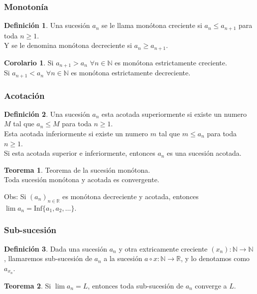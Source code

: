 \documentclass[10pt]{article}
\theoremstyle{definition}
\newtheorem{definition}{Definición}[section]
\newtheorem{theorem}{Teorema}[section]
\newtheorem{corollary}{Corolario}[theorem]
\begin{document}
\subsubsection{Monotonía}
\begin{definition}
	Una sucesión $a_n$ se le llama monótona creciente si $a_n\le a_{n+1}$ para toda $n\ge 1$.\\
	Y se le denomina monótona decreciente si $a_n\ge a_{n+1}$.
\end{definition}
\begin{corollary}
	Si $a_{n+1}>a_n$ $\forall n\in\mathbb{N}$ es monótona estrictamente creciente.\\
	Si $a_{n+1}<a_n$ $\forall n\in\mathbb{N}$ es monótona estrictamente decreciente.
\end{corollary}
\subsubsection{Acotación}
\begin{definition}
	Una sucesión $a_n$ esta acotada superiormente si existe un numero $M$ tal que $a_n \le M$ para toda $n\ge 1$.\\
	Esta acotada inferiormente si existe un numero $m$ tal que $m\le a_n$ para toda $n\ge 1$.\\
	Si esta acotada superior e inferiormente, entonces $a_n$ es una sucesión acotada.
\end{definition}
\begin{theorem}{Teorema de la sucesión monótona.}
	\\Toda sucesión monótona y acotada es convergente.
\end{theorem}
Obs: Si $(a_n)_{n\in\mathbb{R}}$ es monótona decreciente y acotada, entonces $\lim a_n=\text{Inf}\{a_1,a_2,\dots\}$.
\subsubsection{Sub-sucesión}
\begin{definition}
	Dada una sucesión $a_n$ y otra extricamente creciente $(x_n):\mathbb{N}\to\mathbb{N}$, llamaremos sub-sucesión de $a_n$ a la sucesión $a\circ x:\mathbb{N}\to\mathbb{R}$, y lo denotamos como $a_{x_n}$.
\end{definition}
\begin{theorem}
	Si $\lim a_n=L$, entonces toda sub-sucesión de $a_n$ converge a $L$.
\end{theorem}
\end{document}
